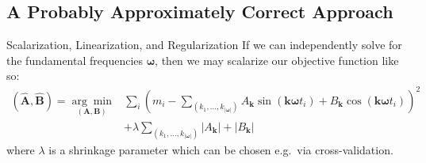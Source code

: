 \documentclass[serif,mathserif,professionalfont]{beamer}
\begin{document}
\subsection{A Probably Approximately Correct Approach}
\begin{frame}{Scalarization, Linearization, and Regularization}
If we can independently solve for the fundamental frequencies $\boldsymbol \omega$, then we may scalarize our objective function like so:
\begin{align*}
(\mathbf {\hat A}, \mathbf{\hat B})
  = \underset{(\mathbf A, \mathbf B)}{\arg\min}
  & \sum_i \left(m_i - 
      \sum_{(k_1, \dots, k_{|\boldsymbol{\omega}|})} 
        A_{\mathbf{k}} \sin \left(\mathbf{k} \boldsymbol{\omega} t_i \right)
      + B_{\mathbf{k}} \cos \left(\mathbf{k} \boldsymbol{\omega} t_i \right)
    \right)^2
\\&+ \lambda \sum_{(k_1, \dots, k_{|\boldsymbol{\omega}|})} |A_{\mathbf{k}}| + |B_{\mathbf{k}}|
\end{align*}
where $\lambda$ is a shrinkage parameter which can be chosen e.g.~via cross-validation. 
\end{frame}
\end{document}
